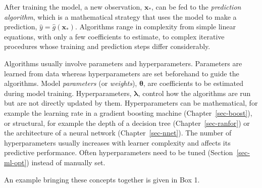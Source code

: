 \documentclass[
  letterpaper,
  krantz2]{style/krantz}
\begin{document}
After training the model, a new observation, \(\mathbf{x}_*\), can be
fed to the \emph{prediction algorithm}, which is a mathematical strategy
that uses the model to make a prediction,
\(\hat{y}= \hat{g}(\mathbf{x}_*)\). Algorithms
range in complexity from simple linear equations, with only a few
coefficients to estimate, to complex iterative procedures whose training
and prediction steps differ considerably.

Algorithms usually involve parameters and
hyperparameters. Parameters are
learned from data whereas hyperparameters are set beforehand to guide
the algorithms. Model \emph{parameters} (or \emph{weights}),
\(\boldsymbol{\theta}\), are coefficients to be estimated during model
training. Hyperparameters, \(\boldsymbol{\lambda}\), control how the
algorithms are run but are not directly updated by them. Hyperparameters
can be mathematical, for example the learning rate in a gradient
boosting machine
(Chapter~\ref{sec-boost}), or structural, for example the depth of a
decision tree (Chapter~\ref{sec-ranfor}) or the
architecture of a neural network
(Chapter~\ref{sec-nnet}). The number of hyperparameters usually
increases with learner complexity and affects its predictive
performance. Often hyperparameters need to be
tuned (Section~\ref{sec-ml-opt})
instead of manually set.

An example bringing these concepts together is given in Box 1.
\end{document}
